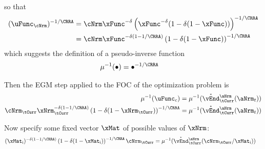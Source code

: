 \documentclass[./SolvingMicroDSOPs]{subfiles}
\begin{document}
{{\begin{align}
      \end{align}
      so that
      \begin{align}
        (\uFunc_{\cNrm})^{-1/\CRRA} & = \cNrm \xFunc^{-\wealthU} \left(\xFunc^{-\wealthU}(1-\wealthU(1-\xFunc))\right)^{-1/\CRRA}\\
                                    & = \cNrm \xFunc^{-\wealthU(1-1/\CRRA)} \left(1-\wealthU(1-\xFunc)\right)^{-1/\CRRA} \notag
      \end{align}
      which suggests the definition of a pseudo-inverse function
      \begin{align}
                                  \muInv(\bullet) & = \bullet^{-1/\CRRA}                              
      \end{align}
      
      Then the EGM step applied to the FOC of the optimization problem is 
      \begin{align}
        \muInv(\uFunc_{c}) & = \muInv(\Maxed{\vEnd}^{\aNrm}_{\tCurr}(\aNrm_{t}))
        \\ \cNrm_{\tCurr} \xNrm_{\tCurr}^{-\wealthU(1-1/\CRRA)} \left(1-\wealthU(1-\xNrm_{\tCurr})\right)^{-1/\CRRA} & = \muInv(\Maxed{\vEnd}^{\aNrm}_{\tCurr}(\aNrm_{t})) \notag
      \end{align}
      
      Now specify some fixed vector $\xMat$ of possible values of $\xNrm$:
      \begin{align}
        (\xMat_{\aIdx})^{-\wealthU(1-1/\CRRA)} \left(1-\wealthU(1-\xMat_{\aIdx})\right)^{-1/\CRRA} \cNrm_{\tCurr} & = \muInv(\Maxed{\vEnd}^{\aNrm}_{\tCurr}(\cNrm_{\tCurr}/\xMat_{\aIdx})) \notag
      \end{align}  
      
}}
\end{document}
